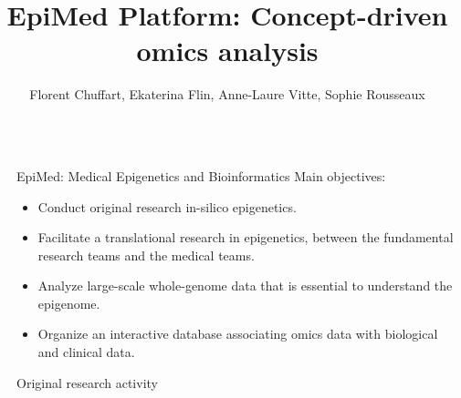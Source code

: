 \documentclass[final]{beamer}
\title{EpiMed Platform: Concept-driven omics analysis} %
\author{Florent Chuffart, Ekaterina Flin, Anne-Laure Vitte, Sophie Rousseaux} %
\institute{Institute for Advanced Biosciences (IAB), Université Grenoble Alpes} %
\newlength{\sepwid}
\newlength{\twocolwid}
\begin{document}

\setlength{\belowcaptionskip}{2ex} %
\setlength\belowdisplayshortskip{2ex} %

\begin{frame}[t] %

\begin{columns}[t] %

\begin{column}{\sepwid}\end{column} %

\begin{column}{\twocolwid} %


\begin{alertblock}{EpiMed: Medical Epigenetics and Bioinformatics}
Main objectives:
\begin{itemize}
\item Conduct original research in-silico epigenetics.   
\item Facilitate a translational research in epigenetics, between the fundamental research teams and the medical teams.
\item Analyze large-scale whole-genome data that is essential to understand the epigenome.
\item Organize an interactive database associating omics data with biological and clinical data.
\end{itemize}

\end{alertblock}



\begin{block}{Original research activity}


\end{block}
\end{column}
\end{columns}
\end{frame}
\end{document}
